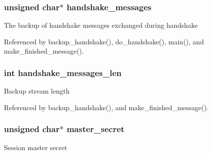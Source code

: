 \subsubsection[{\texorpdfstring{handshake\+\_\+messages}{handshake_messages}}]{\setlength{\rightskip}{0pt plus 5cm}unsigned char$\ast$ handshake\+\_\+messages}\hypertarget{struct_t_l_s__parameters__t_ac6734c87e703c22f7d34f71ca116d005}{}\label{struct_t_l_s__parameters__t_ac6734c87e703c22f7d34f71ca116d005}
The backup of handshake messages exchanged during handshake 

Referenced by backup\+\_\+handshake(), do\+\_\+handshake(), main(), and make\+\_\+finished\+\_\+message().

\subsubsection[{\texorpdfstring{handshake\+\_\+messages\+\_\+len}{handshake_messages_len}}]{\setlength{\rightskip}{0pt plus 5cm}int handshake\+\_\+messages\+\_\+len}\hypertarget{struct_t_l_s__parameters__t_afbdbb7d32255aef8951f95ccc44957fc}{}\label{struct_t_l_s__parameters__t_afbdbb7d32255aef8951f95ccc44957fc}
Backup stream length 

Referenced by backup\+\_\+handshake(), and make\+\_\+finished\+\_\+message().

\subsubsection[{\texorpdfstring{master\+\_\+secret}{master_secret}}]{\setlength{\rightskip}{0pt plus 5cm}unsigned char$\ast$ master\+\_\+secret}\hypertarget{struct_t_l_s__parameters__t_a68c2015df5cb7259aa1abdee33c8e6f3}{}\label{struct_t_l_s__parameters__t_a68c2015df5cb7259aa1abdee33c8e6f3}
Session master secret 

